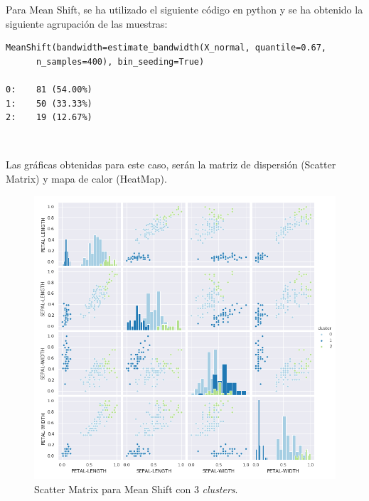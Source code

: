 \documentclass[a4paper, 20pt]{article}
\begin{document}
\clearpage

Para Mean Shift, se ha utilizado el siguiente código en python y se ha obtenido la siguiente agrupación de las muestras:\\

\begin{lstlisting}
MeanShift(bandwidth=estimate_bandwidth(X_normal, quantile=0.67, 
	  n_samples=400), bin_seeding=True)

0:    81 (54.00%)
1:    50 (33.33%)
2:    19 (12.67%)
\end{lstlisting}\

Las gráficas obtenidas para este caso, serán la matriz de dispersión (Scatter Matrix) y mapa de calor (HeatMap).\\

\begin{figure}[h]
\centering
\includegraphics[scale=0.64]{dani/scatmatrixMeanShiftIRIS.png}
\caption{Scatter Matrix para Mean Shift con 3 \textit{clusters}.}
\label{smms}
\end{figure}

\clearpage
\end{document}
